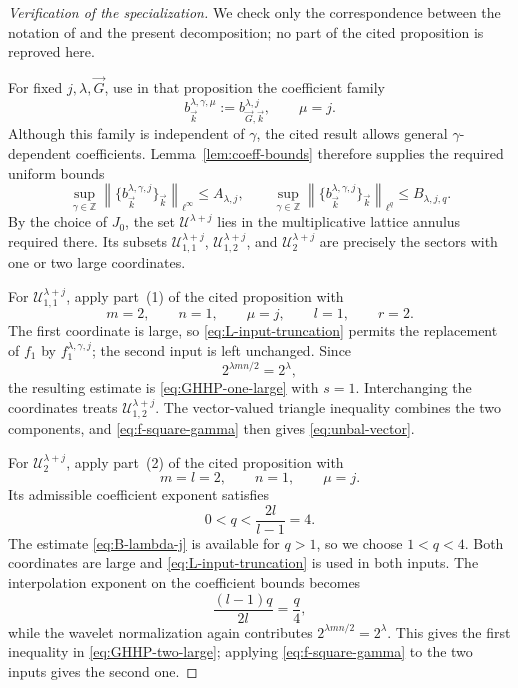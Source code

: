 \documentclass[11pt]{amsart}
\theoremstyle{remark}
\numberwithin{equation}{section}
\newcommand{\cU}{\mathcal U}
\newcommand{\norm}[1]{\left\lVert #1\right\rVert}
\begin{document}
	\begin{proof}[Verification of the specialization]
		We check only the correspondence between the notation of
		\cite[Proposition~2.4]{GrafakosHeHonzikPark2023} and the present
		decomposition; no part of the cited proposition is reproved here.
		
		For fixed \(j,\lambda,\vec G\), use in that proposition the coefficient
		family
		\[
		b_{\vec k}^{\lambda,\gamma,\mu}
		:=b_{\vec G,\vec k}^{\lambda,j},
		\qquad \mu=j.
		\]
		Although this family is independent of \(\gamma\), the cited result allows
		general \(\gamma\)-dependent coefficients. Lemma~\ref{lem:coeff-bounds}
		therefore supplies the required uniform bounds
		\[
		\sup_{\gamma\in\mathbb Z}
		\norm{\{b_{\vec k}^{\lambda,\gamma,j}\}_{\vec k}}_{\ell^\infty}
		\le A_{\lambda,j},
		\qquad
		\sup_{\gamma\in\mathbb Z}
		\norm{\{b_{\vec k}^{\lambda,\gamma,j}\}_{\vec k}}_{\ell^q}
		\le B_{\lambda,j,q}.
		\]
		By the choice of \(J_0\), the set \(\cU^{\lambda+j}\) lies in the
		multiplicative lattice annulus required there. Its subsets
		\(\cU_{1,1}^{\lambda+j}\), \(\cU_{1,2}^{\lambda+j}\), and
		\(\cU_2^{\lambda+j}\) are precisely the sectors with one or two large
		coordinates.
		
		For \(\cU_{1,1}^{\lambda+j}\), apply part~(1) of the cited proposition with
		\[
		m=2,\qquad n=1,\qquad \mu=j,\qquad l=1,\qquad r=2.
		\]
		The first coordinate is large, so \eqref{eq:L-input-truncation} permits the
		replacement of \(f_1\) by \(f_1^{\lambda,\gamma,j}\); the second input is
		left unchanged. Since
		\[
		2^{\lambda mn/2}=2^\lambda,
		\]
		the resulting estimate is \eqref{eq:GHHP-one-large} with \(s=1\).
		Interchanging the coordinates treats \(\cU_{1,2}^{\lambda+j}\). The
		vector-valued triangle inequality combines the two components, and
		\eqref{eq:f-square-gamma} then gives \eqref{eq:unbal-vector}.
		
		For \(\cU_2^{\lambda+j}\), apply part~(2) of the cited proposition with
		\[
		m=l=2,\qquad n=1,\qquad \mu=j.
		\]
		Its admissible coefficient exponent satisfies
		\[
		0<q<\frac{2l}{l-1}=4.
		\]
		The estimate \eqref{eq:B-lambda-j} is available for \(q>1\), so we choose
		\(1<q<4\). Both coordinates are large and
		\eqref{eq:L-input-truncation} is used in both inputs. The interpolation
		exponent on the coefficient bounds becomes
		\[
		\frac{(l-1)q}{2l}=\frac q4,
		\]
		while the wavelet normalization again contributes
		\(2^{\lambda mn/2}=2^\lambda\). This gives the first inequality in
		\eqref{eq:GHHP-two-large}; applying \eqref{eq:f-square-gamma} to the two
		inputs gives the second one.
	\end{proof}
	
\end{document}
